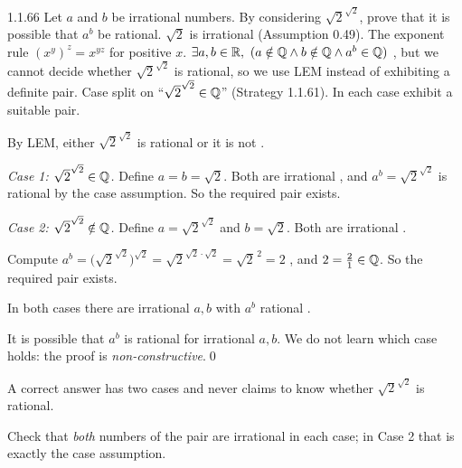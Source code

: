 \begin{bookex}[recommended]{1.1.66}
Let $a$ and $b$ be irrational numbers. By considering $\sqrt2^{\sqrt2}$, prove that it is possible that $a^b$ be rational.
\solution
\given $\sqrt2$ is irrational (Assumption 0.49). The exponent rule $(x^y)^z=x^{yz}$ for positive $x$.
\goal $\exists a,b\in\mathbb{R},\ (a\notin\mathbb{Q}\wedge b\notin\mathbb{Q}\wedge a^b\in\mathbb{Q})$ , but we cannot decide whether $\sqrt2^{\sqrt2}$ is rational, so we use LEM instead of exhibiting a definite pair.
\plan Case split on ``$\sqrt2^{\sqrt2}\in\mathbb{Q}$'' (Strategy 1.1.61). In each case exhibit a suitable pair.
\begin{steps}
\item By LEM, either $\sqrt2^{\sqrt2}$ is rational or it is not .
\item \emph{Case 1: $\sqrt2^{\sqrt2}\in\mathbb{Q}$.} Define $a=b=\sqrt2$. Both are irrational , and $a^b=\sqrt2^{\sqrt2}$ is rational by the case assumption. So the required pair exists.
\item \emph{Case 2: $\sqrt2^{\sqrt2}\notin\mathbb{Q}$.} Define $a=\sqrt2^{\sqrt2}$ and $b=\sqrt2$. Both are irrational .
\item Compute $a^b=\big(\sqrt2^{\sqrt2}\big)^{\sqrt2}=\sqrt2^{\sqrt2\cdot\sqrt2}=\sqrt2^{\,2}=2$ , and $2=\frac21\in\mathbb{Q}$. So the required pair exists.
\item In both cases there are irrational $a,b$ with $a^b$ rational .
\end{steps}
\conclusion It is possible that $a^b$ is rational for irrational $a,b$. We do not learn which case holds: the proof is \emph{non-constructive}.\qed
\begin{compare}
\item A correct answer has two cases and never claims to know whether $\sqrt2^{\sqrt2}$ is rational.
\item Check that \emph{both} numbers of the pair are irrational in each case; in Case 2 that is exactly the case assumption.
\end{compare}
\end{bookex}

